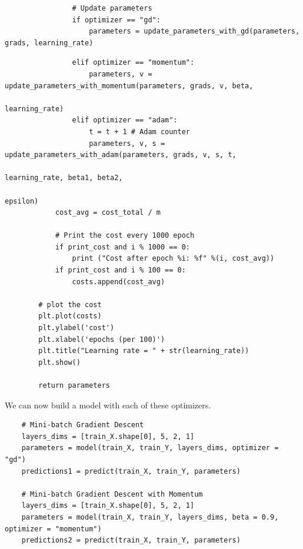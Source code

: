 \documentclass[11pt, a4paper]{article}
\begin{document}
\begin{spacing}{1.1}
\begin{lstlisting}
				# Update parameters
				if optimizer == "gd":
					parameters = update_parameters_with_gd(parameters, grads, learning_rate) \end{lstlisting} \newpage
					
	\begin{lstlisting}
				elif optimizer == "momentum":
					parameters, v = update_parameters_with_momentum(parameters, grads, v, beta, 
					                                                learning_rate)
				elif optimizer == "adam":
					t = t + 1 # Adam counter
					parameters, v, s = update_parameters_with_adam(parameters, grads, v, s, t, 
					                                               learning_rate, beta1, beta2,  
					                                               epsilon)
			cost_avg = cost_total / m
			
			# Print the cost every 1000 epoch
			if print_cost and i % 1000 == 0:
				print ("Cost after epoch %i: %f" %(i, cost_avg))
			if print_cost and i % 100 == 0:
				costs.append(cost_avg)
		
		# plot the cost
		plt.plot(costs)
		plt.ylabel('cost')
		plt.xlabel('epochs (per 100)')
		plt.title("Learning rate = " + str(learning_rate))
		plt.show()
		
		return parameters \end{lstlisting} \vspace*{1mm}
	We can now build a model with each of these optimizers.  
	\begin{lstlisting}
	# Mini-batch Gradient Descent
	layers_dims = [train_X.shape[0], 5, 2, 1]
	parameters = model(train_X, train_Y, layers_dims, optimizer = "gd")
	predictions1 = predict(train_X, train_Y, parameters)
	
	# Mini-batch Gradient Descent with Momentum
	layers_dims = [train_X.shape[0], 5, 2, 1]
	parameters = model(train_X, train_Y, layers_dims, beta = 0.9, optimizer = "momentum")
	predictions2 = predict(train_X, train_Y, parameters)
	

\end{lstlisting}
\end{spacing}
\end{document}
